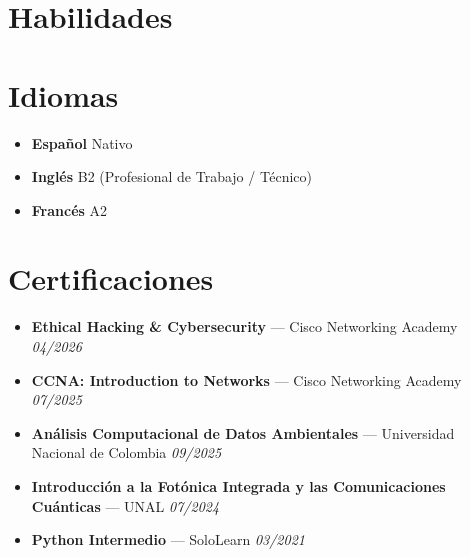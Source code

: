 \documentclass[11pt,a4paper]{article}
\begin{document}
\section{Habilidades}
\begin{tcolorbox}[colback=lightgray, colframe=lightgray, boxrule=0pt, arc=6pt, left=10pt, right=10pt, top=10pt, bottom=10pt]
\noindent
\linespread{1.8}\selectfont
{}
\end{tcolorbox}

\section{Idiomas}
\begin{itemize}[label={}, leftmargin=0.3cm, itemsep=6pt]
    \item \textbf{Español} \hfill Nativo \quad \textcolor{accent}{\faCircle \faCircle \faCircle \faCircle \faCircle}
    \item \textbf{Inglés} \hfill B2 (Profesional de Trabajo / Técnico) \quad \textcolor{accent}{\faCircle \faCircle \faCircle \faCircle} \textcolor{bulletline}{\faCircle}
    \item \textbf{Francés} \hfill A2 \quad \textcolor{accent}{\faCircle \faCircle} \textcolor{bulletline}{\faCircle \faCircle \faCircle}
\end{itemize}

\section{Certificaciones}
\begin{itemize}[label={\color{accentblue}\faAward}, leftmargin=0.6cm, itemsep=6pt]
    \item \textbf{Ethical Hacking \& Cybersecurity} --- Cisco Networking Academy \hfill \textit{04/2026}
    \item \textbf{CCNA: Introduction to Networks} --- Cisco Networking Academy \hfill \textit{07/2025}
    \item \textbf{Análisis Computacional de Datos Ambientales} --- Universidad Nacional de Colombia \hfill \textit{09/2025}
    \item \textbf{Introducción a la Fotónica Integrada y las Comunicaciones Cuánticas} --- UNAL \hfill \textit{07/2024}
    \item \textbf{Python Intermedio} --- SoloLearn \hfill \textit{03/2021}
\end{itemize}
\end{document}
